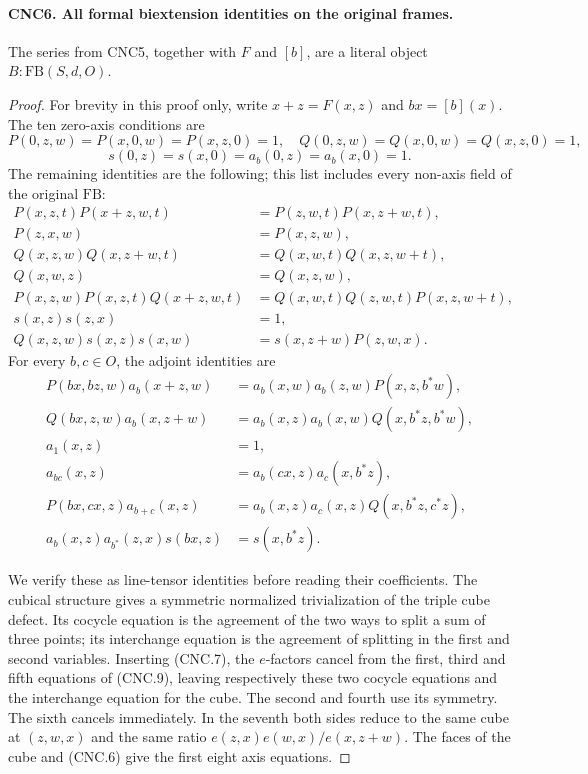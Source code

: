 \documentclass[11pt,a4paper]{article}
\numberwithin{equation}{section}
\theoremstyle{remark}\newtheorem{remark}[theorem]{Remark}
\begin{document}
\paragraph{CNC6. All formal biextension identities on the original frames.}
\label{claim:CNC6}
The series from CNC5, together with \(F\) and \([b]\), are a
literal object \(B:\mathrm{FB}(S,d,O)\).
\begin{proof}
For brevity in this proof only, write \(x+z=F(x,z)\) and
\(b x=[b](x)\).  The ten zero-axis conditions are
\[
 P(0,z,w)=P(x,0,w)=P(x,z,0)=1,
 \quad Q(0,z,w)=Q(x,0,w)=Q(x,z,0)=1,
\]
\[
 s(0,z)=s(x,0)=a_b(0,z)=a_b(x,0)=1.                            \tag{CNC.8}
\]
The remaining identities are the following; this list includes every
non-axis field of the original \(\mathrm{FB}\):
\[
\begin{aligned}
 P(x,z,t)P(x+z,w,t)&=P(z,w,t)P(x,z+w,t),\\
 P(z,x,w)&=P(x,z,w),\\
 Q(x,z,w)Q(x,z+w,t)&=Q(x,w,t)Q(x,z,w+t),\\
 Q(x,w,z)&=Q(x,z,w),\\
 P(x,z,w)P(x,z,t)Q(x+z,w,t)
   &=Q(x,w,t)Q(z,w,t)P(x,z,w+t),\\
 s(x,z)s(z,x)&=1,\\
 Q(x,z,w)s(x,z)s(x,w)&=s(x,z+w)P(z,w,x).
\end{aligned}                                                   \tag{CNC.9}
\]
For every \(b,c\in O\), the adjoint identities are
\[
\begin{aligned}
 P(bx,bz,w)a_b(x+z,w)
   &=a_b(x,w)a_b(z,w)P(x,z,b^*w),\\
 Q(bx,z,w)a_b(x,z+w)
   &=a_b(x,z)a_b(x,w)Q(x,b^*z,b^*w),\\
 a_1(x,z)&=1,\\
 a_{bc}(x,z)&=a_b(cx,z)a_c(x,b^*z),\\
 P(bx,cx,z)a_{b+c}(x,z)
   &=a_b(x,z)a_c(x,z)Q(x,b^*z,c^*z),\\
 a_b(x,z)a_{b^*}(z,x)s(bx,z)&=s(x,b^*z).
\end{aligned}                                                   \tag{CNC.10}
\]

We verify these as line-tensor identities before reading their
coefficients.  The cubical structure gives a symmetric normalized
trivialization of the triple cube defect.  Its cocycle equation is the
agreement of the two ways to split a sum of three points; its
interchange equation is the agreement of splitting in the first and
second variables.  Inserting (CNC.7), the \(e\)-factors cancel from
the first, third and fifth equations of (CNC.9), leaving respectively
these two cocycle equations and the interchange equation for the cube.
The second and fourth use its symmetry.  The sixth cancels immediately.
In the seventh both sides reduce to the same cube at \((z,w,x)\)
and the same ratio
\(e(z,x)e(w,x)/e(x,z+w)\).  The faces of the cube and (CNC.6)
give the first eight axis equations.


\end{proof}
\end{document}
